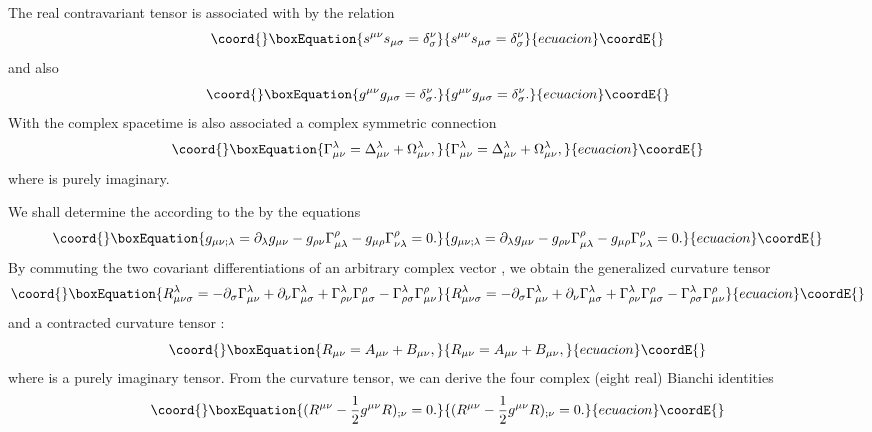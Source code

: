 \documentclass[a4paper,10pt]{article}
\begin{document}
The real contravariant tensor \coordHE{} is associated with \coordHE{}
by the relation
\begin{equation}\coord{}\boxEquation{
s^{\mu\nu}s_{\mu\sigma}=\delta^\nu_\sigma
}{
s^{\mu\nu}s_{\mu\sigma}=\delta^\nu_\sigma
}{ecuacion}\coordE{}\end{equation}
and also
\begin{equation}\coord{}\boxEquation{
g^{\mu\nu}g_{\mu\sigma}=\delta^\nu_\sigma.
}{
g^{\mu\nu}g_{\mu\sigma}=\delta^\nu_\sigma.
}{ecuacion}\coordE{}\end{equation}
With the complex spacetime is also associated a complex symmetric
connection
\begin{equation}\coord{}\boxEquation{
\Gamma^\lambda_{\mu\nu}=\Delta^\lambda_{\mu\nu}+\Omega^\lambda_{\mu\nu},
}{
\Gamma^\lambda_{\mu\nu}=\Delta^\lambda_{\mu\nu}+\Omega^\lambda_{\mu\nu},
}{ecuacion}\coordE{}\end{equation}
where \myHighlight{$\Omega^\lambda_{\mu\nu}$}\coordHE{} is purely imaginary.

We shall determine the \myHighlight{$\Gamma^\lambda_{\mu\nu}$}\coordHE{} according to the
\coordHE{} by the equations
\begin{equation}\coord{}\boxEquation{
\label{gequation}
g_{\mu\nu;\lambda}=\partial_\lambda
g_{\mu\nu}-g_{\rho\nu}\Gamma^\rho_{\mu\lambda}-g_{\mu\rho}\Gamma^\rho_{\nu\lambda}=0.
}{
g_{\mu\nu;\lambda}=\partial_\lambda
g_{\mu\nu}-g_{\rho\nu}\Gamma^\rho_{\mu\lambda}-g_{\mu\rho}\Gamma^\rho_{\nu\lambda}=0.
}{ecuacion}\coordE{}\end{equation}
By commuting the two covariant differentiations of an arbitrary complex
vector \coordHE{}, we obtain the generalized curvature tensor
\begin{equation}\coord{}\boxEquation{
R^\lambda_{\mu\nu\sigma}=-\partial_\sigma\Gamma^\lambda_{\mu\nu}
+\partial_\nu\Gamma^\lambda_{\mu\sigma}+\Gamma^\lambda_{\rho\nu}\Gamma^\rho_{\mu\sigma}
-\Gamma^\lambda_{\rho\sigma}\Gamma^\rho_{\mu\nu}
}{
R^\lambda_{\mu\nu\sigma}=-\partial_\sigma\Gamma^\lambda_{\mu\nu}
+\partial_\nu\Gamma^\lambda_{\mu\sigma}+\Gamma^\lambda_{\rho\nu}\Gamma^\rho_{\mu\sigma}
-\Gamma^\lambda_{\rho\sigma}\Gamma^\rho_{\mu\nu}
}{ecuacion}\coordE{}\end{equation}
and a contracted curvature tensor \coordHE{}:
\begin{equation}\coord{}\boxEquation{
R_{\mu\nu}=A_{\mu\nu}+B_{\mu\nu},
}{
R_{\mu\nu}=A_{\mu\nu}+B_{\mu\nu},
}{ecuacion}\coordE{}\end{equation}
where \coordHE{} is a purely imaginary tensor.
From the curvature tensor, we can derive the four complex (eight real)
Bianchi identities \begin{equation}\coord{}\boxEquation{
\label{Bianchi}
(R^{\mu\nu}-\frac{1}{2}g^{\mu\nu}R)_{;\nu}=0.
}{
(R^{\mu\nu}-\frac{1}{2}g^{\mu\nu}R)_{;\nu}=0.
}{ecuacion}\coordE{}\end{equation}
\end{document}
